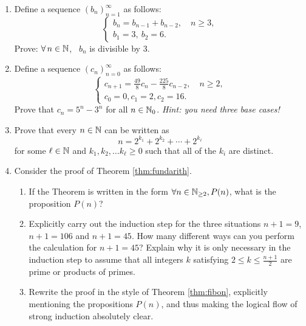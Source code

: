 \begin{exercises}{}{}

\begin{enumerate}
  \item Define a sequence $(b_n)_{n=1}^\infty$ as follows:
  	\[\begin{cases}
			b_n=b_{n-1}+b_{n-2},\quad n\ge 3,\\
			b_1=3,\ b_2=6.
		\end{cases}\]
		Prove: $\forall \,n\in\mathbb{N}$, \ $b_n$ is divisible by 3.
	
	\item\label{ex:ind3strong} Define a sequence $(c_n)_{n=0}^\infty$ as follows:
	  \[\begin{cases}
			c_{n+1}=\frac{49}8c_n-\frac{225}8c_{n-2},\quad n\ge 2,\\
			c_0=0, c_1=2, c_2=16.
		\end{cases}\]
		Prove that $c_n=5^n-3^n$ for all $n\in\mathbb{N}_0$. \emph{Hint: you need three base cases!}
		
			\item Prove that every $n \in \mathbb{N}$ can be written as 
    \[
        n = 2^{k_1} + 2^{k_2} + \cdots + 2^{k_\ell}
    \]
    for some $\ell \in \mathbb{N}$ and $k_1, k_2, \ldots k_\ell \geq 0$ such that all of the $k_i$ are distinct.
		
	\item Consider the proof of Theorem \ref{thm:fundarith}.
	\begin{enumerate}
	  \item If the Theorem is written in the form $\forall n\in\mathbb{N}_{\ge 2}, P(n)$, what is the proposition $P(n)$?
	  \item Explicitly carry out the induction step for the three situations $n+1=9$, $n+1=106$ and $n+1=45$. How many different ways can you perform the calculation for $n+1=45$? Explain why it is only necessary in the induction step to assume that all integers $k$ satisfying $2\le k\le\frac{n+1}2$ are prime or products of primes.
	  \item Rewrite the proof in the style of Theorem \ref{thm:fibon}, explicitly mentioning the propositions $P(n)$, and thus making the logical flow of strong induction absolutely clear.
	\end{enumerate}


\end{enumerate}
\end{exercises}
